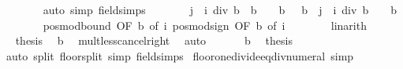 \begin{isabellebody}
\ \ \ \ \ \ \isamarkupfalse%
\ {\isacharparenleft}{\kern0pt}auto\ simp{\isacharcolon}{\kern0pt}\ field{\isacharunderscore}{\kern0pt}simps{\isacharparenright}{\kern0pt}\isanewline
\ \ \ \ \isamarkupfalse%
\ \isamarkupfalse%
\ {\isachardoublequoteopen}{\isacharparenleft}{\kern0pt}j\ {\isacharminus}{\kern0pt}\ i\ div\ b{\isacharparenright}{\kern0pt}\ {\isacharasterisk}{\kern0pt}\ b\ {\isacharless}{\kern0pt}\ {}\ {\isacharasterisk}{\kern0pt}\ b{\isachardoublequoteclose}\ {\isachardoublequoteopen}{}\ {\isacharasterisk}{\kern0pt}\ b\ {\isacharless}{\kern0pt}\ {\isacharparenleft}{\kern0pt}{\isacharparenleft}{\kern0pt}j\ {\isacharminus}{\kern0pt}\ i\ div\ b{\isacharparenright}{\kern0pt}\ {\isacharplus}{\kern0pt}\ {}{\isacharparenright}{\kern0pt}\ {\isacharasterisk}{\kern0pt}\ b{\isachardoublequoteclose}\isanewline
\ \ \ \ \ \ \isamarkupfalse%
\ pos{\isacharunderscore}{\kern0pt}mod{\isacharunderscore}{\kern0pt}bound\ {\isacharbrackleft}{\kern0pt}OF\ b{\isacharcomma}{\kern0pt}\ of\ i{\isacharbrackright}{\kern0pt}\ pos{\isacharunderscore}{\kern0pt}mod{\isacharunderscore}{\kern0pt}sign\ {\isacharbrackleft}{\kern0pt}OF\ b{\isacharcomma}{\kern0pt}\ of\ i{\isacharbrackright}{\kern0pt}\isanewline
\ \ \ \ \ \ \isamarkupfalse%
\ linarith{\isacharplus}{\kern0pt}\isanewline
\ \ \ \ \isamarkupfalse%
\ \isamarkupfalse%
\ {\isacharquery}{\kern0pt}thesis\ \isamarkupfalse%
\ b\ \isamarkupfalse%
\ mult{\isacharunderscore}{\kern0pt}less{\isacharunderscore}{\kern0pt}cancel{\isacharunderscore}{\kern0pt}right\ \isamarkupfalse%
\ auto\isanewline
\ \ \isamarkupfalse%
\isanewline
\ \ \isamarkupfalse%
\ b\ \isamarkupfalse%
\ {\isacharquery}{\kern0pt}thesis\ \isamarkupfalse%
\ {\isacharparenleft}{\kern0pt}auto\ split{\isacharcolon}{\kern0pt}\ floor{\isacharunderscore}{\kern0pt}split\ simp{\isacharcolon}{\kern0pt}\ field{\isacharunderscore}{\kern0pt}simps{\isacharparenright}{\kern0pt}\isanewline
{}\isamarkupfalse%
%
\endisatagproof
{\isafoldproof}%
%
\isadelimproof
\isanewline
%
\endisadelimproof
\isanewline
{}\isamarkupfalse%
\ floor{\isacharunderscore}{\kern0pt}one{\isacharunderscore}{\kern0pt}divide{\isacharunderscore}{\kern0pt}eq{\isacharunderscore}{\kern0pt}div{\isacharunderscore}{\kern0pt}numeral\ {\isacharbrackleft}{\kern0pt}simp{\isacharbrackright}{\kern0pt}{\isacharcolon}{\kern0pt}\isanewline

\end{isabellebody}
